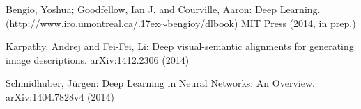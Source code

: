 \documentclass[citeauthoryear]{llncs}
\begin{document}
%
%
\begin{thebibliography}{}
%
\newcommand{\mytilde}{\raise.17ex\hbox{$\scriptstyle\mathtt{\sim}$}}


Bengio, Yoshua; Goodfellow, Ian J. and Courville, Aaron:
Deep Learning.
(http://www.iro.umontreal.ca/\mytilde{}bengioy/dlbook)
MIT Press (2014, in prep.)







Karpathy, Andrej and Fei-Fei, Li:
Deep visual-semantic alignments for generating image descriptions.
arXiv:1412.2306 (2014)


Schmidhuber, J{\"u}rgen:
Deep Learning in Neural Networks: An Overview.
arXiv:1404.7828v4 (2014)



\end{thebibliography}
\end{document}
